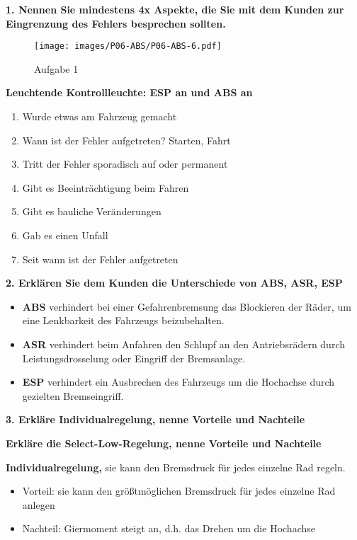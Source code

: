 \textbf{1. Nennen Sie mindestens 4x Aspekte, die Sie mit dem Kunden zur
Eingrenzung des Fehlers besprechen sollten.}

\begin{figure}[!ht]%
\centering
\texttt{[image: images/P06-ABS/P06-ABS-6.pdf]}
\caption{Aufgabe 1}
\end{figure}

\textbf{Leuchtende Kontrollleuchte: ESP an und ABS an}

\begin{enumerate}
\item
  Wurde etwas am Fahrzeug gemacht
\item
  Wann ist der Fehler aufgetreten? Starten, Fahrt
\item
  Tritt der Fehler sporadisch auf oder permanent
\item
  Gibt es Beeinträchtigung beim Fahren
\item
  Gibt es bauliche Veränderungen
\item
  Gab es einen Unfall
\item
  Seit wann ist der Fehler aufgetreten
\end{enumerate}

\textbf{2. Erklären Sie dem Kunden die Unterschiede von ABS, ASR, ESP}

\begin{itemize}
\item
  \textbf{ABS} verhindert bei einer Gefahrenbremsung das Blockieren der
  Räder, um eine Lenkbarkeit des Fahrzeugs beizubehalten.
\item
  \textbf{ASR} verhindert beim Anfahren den Schlupf an den
  Antriebsrädern durch Leistungsdrosselung oder Eingriff der
  Bremsanlage.
\item
  \textbf{ESP} verhindert ein Ausbrechen des Fahrzeugs um die Hochachse
  durch gezielten Bremseingriff.
\end{itemize}

\textbf{3. Erkläre Individualregelung, nenne Vorteile und Nachteile}

\textbf{Erkläre die Select-Low-Regelung, nenne Vorteile und Nachteile}

\textbf{Individualregelung,} sie kann den Bremsdruck für jedes einzelne
Rad regeln.

\begin{itemize}
\item
  Vorteil: sie kann den größtmöglichen Bremsdruck für jedes einzelne Rad
  anlegen
\item
  Nachteil: Giermoment steigt an, d.h. das Drehen um die Hochachse
\end{itemize}

